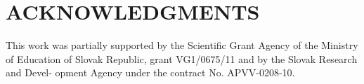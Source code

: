 \documentclass{acm_proc_article-sp} %
\begin{document}
\section{ACKNOWLEDGMENTS}
This work was partially supported by the Scientific Grant
Agency of the Ministry of Education of Slovak Republic,
grant VG1/0675/11 and by the Slovak Research and Devel-
opment Agency under the contract No. APVV-0208-10.




\balancecolumns
\end{document}
